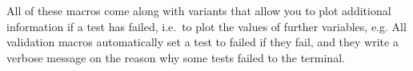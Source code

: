 \noindent
All of these macros come along with variants that allow you to plot additional
information if a test has failed, i.e.~to plot the values of further variables,
e.g.
All validation macros automatically set a test to failed if they fail, and they
write a verbose message on the reason why some tests failed to the terminal.  

